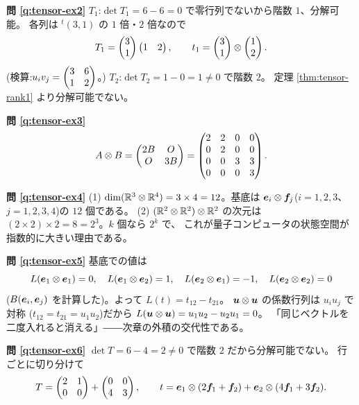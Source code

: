 \bigskip
\noindent\textbf{問 \ref{q:tensor-ex2}}\quad
$T_1$:$\det T_1 = 6 - 6 = 0$ で零行列でないから階数 $1$、分解可能。
各列は ${}^t(3, 1)$ の $1$ 倍・$2$ 倍なので
\[
T_1 = \begin{pmatrix}3 \\ 1\end{pmatrix}\begin{pmatrix}1 & 2\end{pmatrix}, \qquad
t_1 = \begin{pmatrix}3 \\ 1\end{pmatrix} \otimes \begin{pmatrix}1 \\ 2\end{pmatrix}.
\]
(検算:$u_i v_j = \begin{pmatrix}3 & 6 \\ 1 & 2\end{pmatrix}$。)
$T_2$:$\det T_2 = 1 - 0 = 1 \neq 0$ で階数 $2$。
定理 \ref{thm:tensor-rank1} より分解可能でない。

\bigskip
\noindent\textbf{問 \ref{q:tensor-ex3}}\quad
\[
A \otimes B = \begin{pmatrix}2B & O \\ O & 3B\end{pmatrix}
= \begin{pmatrix}2 & 2 & 0 & 0 \\ 0 & 2 & 0 & 0 \\
0 & 0 & 3 & 3 \\ 0 & 0 & 0 & 3\end{pmatrix}.
\]

\bigskip
\noindent\textbf{問 \ref{q:tensor-ex4}}\quad
(1) $\dim(\mathbb{R}^3 \otimes \mathbb{R}^4) = 3 \times 4 = 12$。基底は
$\bm{e}_i \otimes \bm{f}_j$($i = 1, 2, 3$、$j = 1, 2, 3, 4$)の
$12$ 個である。
(2) $(\mathbb{R}^2 \otimes \mathbb{R}^2) \otimes \mathbb{R}^2$ の次元は
$(2 \times 2) \times 2 = 8 = 2^3$。$k$ 個なら $2^k$ で、
これが量子コンピュータの状態空間が指数的に大きい理由である。

\bigskip
\noindent\textbf{問 \ref{q:tensor-ex5}}\quad
基底での値は
\[
L(\bm{e}_1 \otimes \bm{e}_1) = 0, \quad
L(\bm{e}_1 \otimes \bm{e}_2) = 1, \quad
L(\bm{e}_2 \otimes \bm{e}_1) = -1, \quad
L(\bm{e}_2 \otimes \bm{e}_2) = 0
\]
($B(\bm{e}_i, \bm{e}_j)$ を計算した)。よって
$L(t) = t_{12} - t_{21}$。
$\bm{u} \otimes \bm{u}$ の係数行列は $u_i u_j$ で対称
($t_{12} = t_{21} = u_1 u_2$)だから
$L(\bm{u} \otimes \bm{u}) = u_1 u_2 - u_2 u_1 = 0$。
「同じベクトルを二度入れると消える」――次章の外積の交代性である。

\bigskip
\noindent\textbf{問 \ref{q:tensor-ex6}}\quad
$\det T = 6 - 4 = 2 \neq 0$ で階数 $2$ だから分解可能でない。
行ごとに切り分けて
\[
T = \begin{pmatrix}2 & 1 \\ 0 & 0\end{pmatrix} + \begin{pmatrix}0 & 0 \\ 4 & 3\end{pmatrix}, \qquad
t = \bm{e}_1 \otimes (2\bm{f}_1 + \bm{f}_2)
+ \bm{e}_2 \otimes (4\bm{f}_1 + 3\bm{f}_2).
\]

